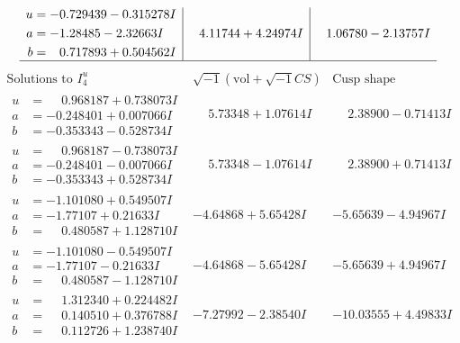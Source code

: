 \documentclass[1p]{elsarticle_modified}
\theoremstyle{definition}
\newcommand{\I}{\sqrt{-1}}
\begin{document}
$$\begin{array}{c|c|c}
\begin{aligned}
u &= -0.729439 - 0.315278 I \\
a &= -1.28485 - 2.32663 I \\
b &= \phantom{-}0.717893 + 0.504562 I\end{aligned}
 & \phantom{-}4.11744 + 4.24974 I & \phantom{-}1.06780 - 2.13757 I\\
 \hline 
 \end{array}$$\newpage$$\begin{array}{c|c|c}  
\text{Solutions to }I^u_{4}& \I (\text{vol} + \sqrt{-1}CS) & \text{Cusp shape}\\
 \hline 
\begin{aligned}
u &= \phantom{-}0.968187 + 0.738073 I \\
a &= -0.248401 + 0.007066 I \\
b &= -0.353343 - 0.528734 I\end{aligned}
 & \phantom{-}5.73348 + 1.07614 I & \phantom{-}2.38900 - 0.71413 I \\ \hline\begin{aligned}
u &= \phantom{-}0.968187 - 0.738073 I \\
a &= -0.248401 - 0.007066 I \\
b &= -0.353343 + 0.528734 I\end{aligned}
 & \phantom{-}5.73348 - 1.07614 I & \phantom{-}2.38900 + 0.71413 I \\ \hline\begin{aligned}
u &= -1.101080 + 0.549507 I \\
a &= -1.77107 + 0.21633 I \\
b &= \phantom{-}0.480587 + 1.128710 I\end{aligned}
 & -4.64868 + 5.65428 I & -5.65639 - 4.94967 I \\ \hline\begin{aligned}
u &= -1.101080 - 0.549507 I \\
a &= -1.77107 - 0.21633 I \\
b &= \phantom{-}0.480587 - 1.128710 I\end{aligned}
 & -4.64868 - 5.65428 I & -5.65639 + 4.94967 I \\ \hline\begin{aligned}
u &= \phantom{-}1.312340 + 0.224482 I \\
a &= \phantom{-}0.140510 + 0.376788 I \\
b &= \phantom{-}0.112726 + 1.238740 I\end{aligned}
 & -7.27992 - 2.38540 I & -10.03555 + 4.49833 I \\ \hline\begin{aligned}

\end{aligned}
\end{array}$$
\end{document}
